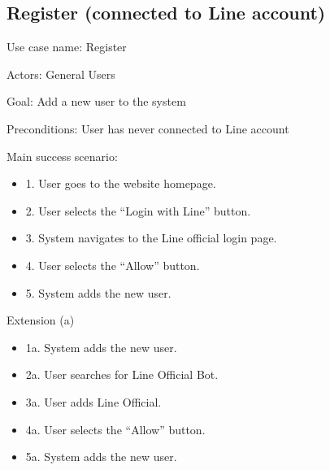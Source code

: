 \documentclass[12pt,oneside,openright,a4paper]{cpe-english-project}
\begin{document}
      \subsection{Register (connected to Line account)}
        \qquad Use case name: Register \par
        \qquad Actors: General Users \par
        \qquad Goal: Add a new user to the system \par
        \qquad Preconditions: User has never connected to Line account \par
        \qquad Main success scenario:
        \begin{itemize}
          \item[] 1. User goes to the website homepage.
          \item[] 2. User selects the “Login with Line” button.
          \item[] 3. System navigates to the Line official login page.
          \item[] 4. User selects the “Allow” button.
          \item[] 5. System adds the new user.
        \end{itemize}
        \qquad Extension (a)
        \begin{itemize}
          \item[] 1a. System adds the new user.
          \item[] 2a. User searches for Line Official Bot.
          \item[] 3a. User adds Line Official.
          \item[] 4a. User selects the “Allow” button. 
          \item[] 5a. System adds the new user.
        \end{itemize}
      
\end{document}

